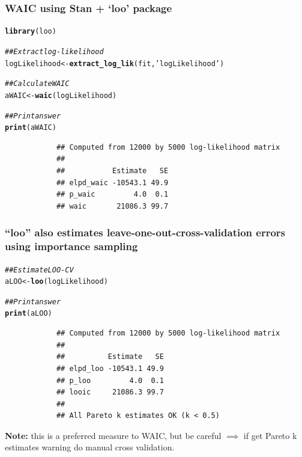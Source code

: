 \documentclass[handout]{beamer}
\makeatletter
\newcommand{\hlstr}[1]{\textcolor[rgb]{0.192,0.494,0.8}{#1}}%
\newcommand{\hlcom}[1]{\textcolor[rgb]{0.678,0.584,0.686}{\textit{#1}}}%
\newcommand{\hlstd}[1]{\textcolor[rgb]{0.345,0.345,0.345}{#1}}%
\newcommand{\hlkwb}[1]{\textcolor[rgb]{0.69,0.353,0.396}{#1}}%
\newcommand{\hlkwd}[1]{\textcolor[rgb]{0.737,0.353,0.396}{\textbf{#1}}}%
\newenvironment{kframe}{%
	\def\at@end@of@kframe{}%
	\ifinner\ifhmode%
	\def\at@end@of@kframe{\end{minipage}}%
\begin{minipage}{\columnwidth}%
	\fi\fi%
	\def\FrameCommand##1{\hskip\@totalleftmargin \hskip-\fboxsep
		\colorbox{shadecolor}{##1}\hskip-\fboxsep
		\hskip-\linewidth \hskip-\@totalleftmargin \hskip\columnwidth}%
	\MakeFramed {\advance\hsize-\width
		\@totalleftmargin\z@ \linewidth\hsize
		\@setminipage}}%
{\par\unskip\endMakeFramed%
	\at@end@of@kframe}
\newenvironment{knitrout}{}{} %
\makeatother
\begin{document}
\begin{frame}[fragile]
	\frametitle{WAIC using Stan + `loo' package}
	\begin{knitrout}
		\small
		\color{fgcolor}\begin{kframe}
			\begin{alltt}
				\hlkwd{library}\hlstd{(loo)}
			\end{alltt}
			\begin{alltt}
				\hlcom{## Extract log-likelihood}
				\hlstd{logLikelihood} \hlkwb{<-} \hlkwd{extract_log_lik}\hlstd{(fit,}\hlstr{'logLikelihood'}\hlstd{)}
				
				\hlcom{## Calculate WAIC}
				\hlstd{aWAIC} \hlkwb{<-} \hlkwd{waic}\hlstd{(logLikelihood)}
				
				\hlcom{## Print answer}
				\hlkwd{print}\hlstd{(aWAIC)}
			\end{alltt}
			\begin{verbatim}
			## Computed from 12000 by 5000 log-likelihood matrix
			## 
			##           Estimate   SE
			## elpd_waic -10543.1 49.9
			## p_waic         4.0  0.1
			## waic       21086.3 99.7
			\end{verbatim}
		\end{kframe}
	\end{knitrout}
\end{frame}

\begin{frame}[fragile]
	\frametitle{``loo'' also estimates leave-one-out-cross-validation errors using importance sampling}
	\begin{knitrout}
		\footnotesize
		\color{fgcolor}\begin{kframe}
			\begin{alltt}
				\hlcom{## Estimate LOO-CV}
				\hlstd{aLOO} \hlkwb{<-} \hlkwd{loo}\hlstd{(logLikelihood)}
				
				\hlcom{## Print answer}
				\hlkwd{print}\hlstd{(aLOO)}
			\end{alltt}
			\begin{verbatim}
			## Computed from 12000 by 5000 log-likelihood matrix
			## 
			##          Estimate   SE
			## elpd_loo -10543.1 49.9
			## p_loo         4.0  0.1
			## looic     21086.3 99.7
			## 
			## All Pareto k estimates OK (k < 0.5)
			\end{verbatim}
		\end{kframe}
	\end{knitrout}
	
	\textbf{Note:} this is a preferred measure to WAIC, but be careful $\implies$ if get Pareto k estimates warning do manual cross validation.
	
\end{frame}
\end{document}
